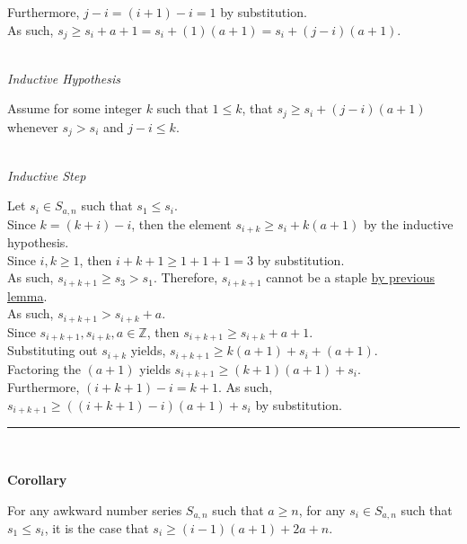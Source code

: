 \documentclass[a4paper,12pt]{article}
\begin{document}
\noindent Furthermore, $j - i = (i + 1) - i = 1$ by substitution.\\

\noindent As such, $s_j \geq s_i + a + 1 = s_i + (1)(a + 1) = s_i + (j - i)(a + 1)$.


\noindent \\
\textit{Inductive Hypothesis}

\noindent Assume for some integer $k$ such that $1 \leq k$, that $s_j \geq s_i + (j - i)(a + 1)$ whenever $s_j > s_i$ and $j - i \leq k$.


\noindent \\
\textit{Inductive Step}

\noindent Let $s_i \in S_{a, n}$ such that $s_1 \leq s_i$.\\

\noindent Since $k = (k + i) - i$, then the element $s_{i + k} \geq s_i + k(a + 1)$ by the inductive hypothesis.\\

\noindent Since $i, k \geq 1$, then $i + k + 1 \geq 1 + 1 + 1 = 3$ by substitution.\\

\noindent As such, $s_{i + k + 1} \geq s_3 > s_1$. Therefore, $s_{i + k + 1}$ cannot be a staple \hyperlink{lemma:only_staple}{by previous lemma}.\\

\noindent As such, $s_{i + k + 1} > s_{i + k} + a$.\\

\noindent Since $s_{i + k + 1}, s_{i + k}, a \in \mathbb{Z}$, then $s_{i + k + 1} \geq s_{i + k} + a + 1$.\\

\noindent Substituting out $s_{i + k}$ yields, $s_{i + k + 1} \geq k(a + 1) + s_i + (a + 1)$.\\

\noindent Factoring the $(a + 1)$ yields $s_{i + k + 1} \geq (k + 1)(a + 1) + s_i$.\\

\noindent Furthermore, $(i + k + 1) - i = k + 1$. As such, $s_{i + k + 1} \geq ((i + k + 1) - i)(a + 1) + s_i$ by substitution.

\begin{center}
\noindent\rule{8cm}{0.4pt}
\end{center}
\noindent \\






\label{corollary:min_length_one_staple_pt2}
\hypertarget{corollary:min_length_one_staple_pt2}{}
\begin{tcolorbox}
\textbf{Corollary}

\noindent For any awkward number series $S_{a,n}$ such that $a \geq n$, for any $s_i \in S_{a, n}$ such that $s_1 \leq s_i$, it is the case that $s_i \geq (i - 1)(a + 1) + 2a + n$.

\end{tcolorbox}
\end{document}

